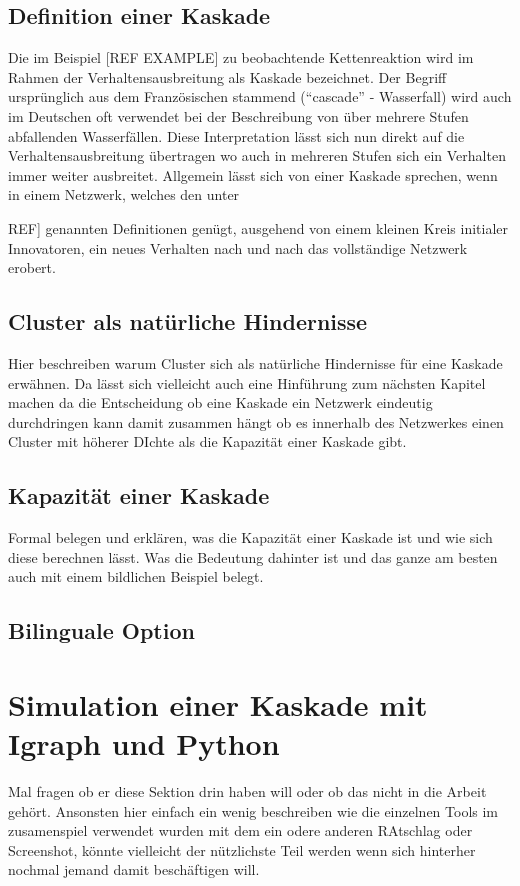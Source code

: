 \documentclass[12pt]{article}
\begin{document}
\subsection{Definition einer Kaskade}
Die im Beispiel [REF EXAMPLE] zu beobachtende Kettenreaktion wird im Rahmen der Verhaltensausbreitung als Kaskade bezeichnet. Der Begriff ursprünglich aus dem Französischen stammend ("`cascade"' - Wasserfall) wird auch im Deutschen oft verwendet bei der Beschreibung von über mehrere Stufen abfallenden Wasserfällen. Diese Interpretation lässt sich nun direkt auf die Verhaltensausbreitung übertragen wo auch in mehreren Stufen sich ein Verhalten immer weiter ausbreitet. Allgemein lässt sich von einer Kaskade sprechen, wenn in einem Netzwerk, welches den unter {REF] genannten Definitionen genügt, ausgehend von einem kleinen Kreis initialer Innovatoren, ein neues Verhalten nach und nach das vollständige Netzwerk erobert.
\subsection{Cluster als natürliche Hindernisse}
Hier beschreiben warum Cluster sich als natürliche Hindernisse für eine Kaskade erwähnen. Da lässt sich vielleicht auch eine Hinführung zum nächsten Kapitel machen da die Entscheidung ob eine Kaskade ein Netzwerk eindeutig durchdringen kann damit zusammen hängt ob es innerhalb des Netzwerkes einen Cluster mit höherer DIchte als die Kapazität einer Kaskade gibt.
\subsection{Kapazität einer Kaskade}
Formal belegen und erklären, was die Kapazität einer Kaskade ist und wie sich diese berechnen lässt. Was die Bedeutung dahinter ist und das ganze am besten auch mit einem bildlichen Beispiel belegt.
\subsection{Bilinguale Option}


\section{Simulation einer Kaskade mit Igraph und Python}
Mal fragen ob er diese Sektion drin haben will oder ob das nicht in die Arbeit gehört. Ansonsten hier einfach ein wenig beschreiben wie die einzelnen Tools im zusamenspiel verwendet wurden mit dem ein odere anderen RAtschlag oder Screenshot, könnte vielleicht der nützlichste Teil werden wenn sich hinterher nochmal jemand damit beschäftigen will.

}
\end{document}
